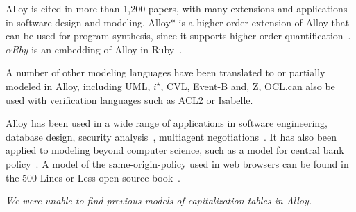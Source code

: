 Alloy is cited in more than 1,200 papers, with many extensions and applications
in software design and modeling. Alloy$\ast$ is a higher-order extension of
Alloy that can be used for program synthesis, since it supports higher-order
quantification~\cite{Milicevic2017}. $\alpha{Rb}y$ is an embedding of Alloy in
Ruby~\cite{Arby}.

A number of other modeling languages have been translated to or partially modeled in Alloy\cite{alloy-case-studies}, including UML, $i^\star$, CVL, Event-B and, Z, OCL.\@Alloy can also be used with verification languages such as ACL2 or Isabelle.

Alloy has been used in a wide range of applications in software engineering, database design, \gls{security} analysis~\cite{Carpio2021}\cite{Chen2006}, multiagent negotiations~\cite{Podorozhny}. It has also been applied to modeling beyond computer science, such as a model for central bank policy~\cite{Johnson2021}. A model of the same-origin-policy used in web browsers can be found in the 500 Lines or Less open-source book~\cite{500Lines19:online}.

\textit{We were unable to find previous models of \glspl{capitalization-table} in Alloy.}
